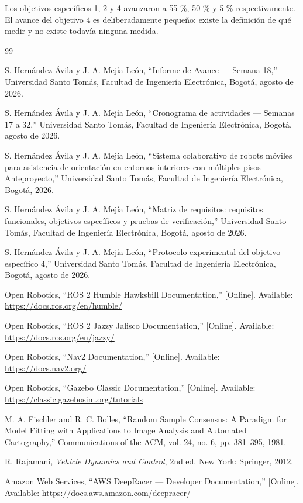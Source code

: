 \documentclass[12pt,letterpaper]{article}
\begin{document}
Los objetivos específicos 1, 2 y 4 avanzaron a 55 \%, 50 \% y 5 \% respectivamente. El avance del objetivo 4 es deliberadamente pequeño: existe la definición de qué medir y no existe todavía ninguna medida.

\begin{thebibliography}{99}

S. Hernández Ávila y J. A. Mejía León,
``Informe de Avance --- Semana 18,''
Universidad Santo Tomás, Facultad de Ingeniería Electrónica, Bogotá, agosto de 2026.

S. Hernández Ávila y J. A. Mejía León,
``Cronograma de actividades --- Semanas 17 a 32,''
Universidad Santo Tomás, Facultad de Ingeniería Electrónica, Bogotá, agosto de 2026.

S. Hernández Ávila y J. A. Mejía León,
``Sistema colaborativo de robots móviles para asistencia de orientación en entornos interiores con múltiples pisos --- Anteproyecto,''
Universidad Santo Tomás, Facultad de Ingeniería Electrónica, Bogotá, 2026.

S. Hernández Ávila y J. A. Mejía León,
``Matriz de requisitos: requisitos funcionales, objetivos específicos y pruebas de verificación,''
Universidad Santo Tomás, Facultad de Ingeniería Electrónica, Bogotá, agosto de 2026.

S. Hernández Ávila y J. A. Mejía León,
``Protocolo experimental del objetivo específico 4,''
Universidad Santo Tomás, Facultad de Ingeniería Electrónica, Bogotá, agosto de 2026.

Open Robotics,
``ROS 2 Humble Hawksbill Documentation,''
[Online]. Available: \url{https://docs.ros.org/en/humble/}

Open Robotics,
``ROS 2 Jazzy Jalisco Documentation,''
[Online]. Available: \url{https://docs.ros.org/en/jazzy/}

Open Robotics,
``Nav2 Documentation,''
[Online]. Available: \url{https://docs.nav2.org/}

Open Robotics,
``Gazebo Classic Documentation,''
[Online]. Available: \url{https://classic.gazebosim.org/tutorials}

M. A. Fischler and R. C. Bolles,
``Random Sample Consensus: A Paradigm for Model Fitting with Applications to Image Analysis and Automated Cartography,''
Communications of the ACM, vol. 24, no. 6, pp. 381--395, 1981.

R. Rajamani,
\textit{Vehicle Dynamics and Control}, 2nd ed.
New York: Springer, 2012.

Amazon Web Services,
``AWS DeepRacer --- Developer Documentation,''
[Online]. Available: \url{https://docs.aws.amazon.com/deepracer/}

\end{thebibliography}
\end{document}
